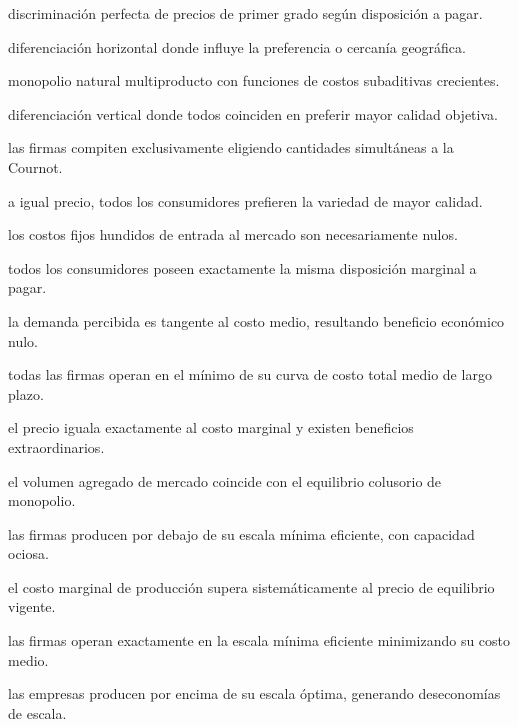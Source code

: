 \begin{opts}
    \item discriminación perfecta de precios de primer grado según disposición a pagar.
    \item diferenciación horizontal donde influye la preferencia o cercanía geográfica.
    \item monopolio natural multiproducto con funciones de costos subaditivas crecientes.
    \item diferenciación vertical donde todos coinciden en preferir mayor calidad objetiva.
\end{opts}

\begin{opts}
    \item las firmas compiten exclusivamente eligiendo cantidades simultáneas a la Cournot.
    \item a igual precio, todos los consumidores prefieren la variedad de mayor calidad.
    \item los costos fijos hundidos de entrada al mercado son necesariamente nulos.
    \item todos los consumidores poseen exactamente la misma disposición marginal a pagar.
\end{opts}

\begin{opts}
    \item la demanda percibida es tangente al costo medio, resultando beneficio económico nulo.
    \item todas las firmas operan en el mínimo de su curva de costo total medio de largo plazo.
    \item el precio iguala exactamente al costo marginal y existen beneficios extraordinarios.
    \item el volumen agregado de mercado coincide con el equilibrio colusorio de monopolio.
\end{opts}

\begin{opts}
    \item las firmas producen por debajo de su escala mínima eficiente, con capacidad ociosa.
    \item el costo marginal de producción supera sistemáticamente al precio de equilibrio vigente.
    \item las firmas operan exactamente en la escala mínima eficiente minimizando su costo medio.
    \item las empresas producen por encima de su escala óptima, generando deseconomías de escala.
\end{opts}

